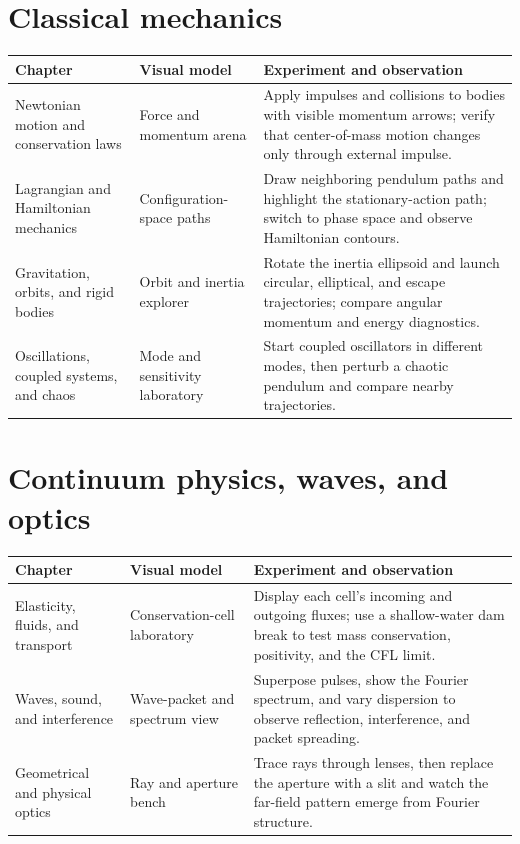 \documentclass[11pt,oneside]{book}
\theoremstyle{reviewstyle}
\begin{document}
\section{Classical mechanics}
\begin{longtable}{p{}p{}p{}}
\toprule Chapter & Visual model & Experiment and observation\\ \midrule
\endhead
Newtonian motion and conservation laws & Force and momentum arena & Apply impulses and collisions to bodies with visible momentum arrows; verify that center-of-mass motion changes only through external impulse.\\
Lagrangian and Hamiltonian mechanics & Configuration-space paths & Draw neighboring pendulum paths and highlight the stationary-action path; switch to phase space and observe Hamiltonian contours.\\
Gravitation, orbits, and rigid bodies & Orbit and inertia explorer & Rotate the inertia ellipsoid and launch circular, elliptical, and escape trajectories; compare angular momentum and energy diagnostics.\\
Oscillations, coupled systems, and chaos & Mode and sensitivity laboratory & Start coupled oscillators in different modes, then perturb a chaotic pendulum and compare nearby trajectories.\\
\bottomrule
\end{longtable}

\section{Continuum physics, waves, and optics}
\begin{longtable}{p{}p{}p{}}
\toprule Chapter & Visual model & Experiment and observation\\ \midrule
\endhead
Elasticity, fluids, and transport & Conservation-cell laboratory & Display each cell's incoming and outgoing fluxes; use a shallow-water dam break to test mass conservation, positivity, and the CFL limit.\\
Waves, sound, and interference & Wave-packet and spectrum view & Superpose pulses, show the Fourier spectrum, and vary dispersion to observe reflection, interference, and packet spreading.\\
Geometrical and physical optics & Ray and aperture bench & Trace rays through lenses, then replace the aperture with a slit and watch the far-field pattern emerge from Fourier structure.\\
\bottomrule
\end{longtable}
\end{document}
